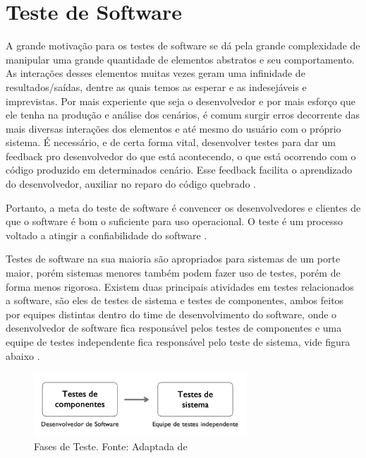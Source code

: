 \documentclass[pnumabnt,normaltoc,espacoumemeio,capchap]{abnt}
\begin{document}
\section{Teste de Software}
\par 

\par A grande motivação para os testes de software se dá pela grande complexidade de manipular uma grande quantidade de elementos abstratos e seu comportamento. As interações desses elementos muitas vezes geram uma infinidade de resultados/saídas, dentre as quais temos as esperar e as indesejáveis e imprevistas. Por mais experiente que seja o desenvolvedor e por mais esforço que ele tenha na produção e análise dos cenários, é comum surgir erros decorrente das mais diversas interações dos elementos e até mesmo do usuário com o próprio sistema. É necessário, e de certa forma vital, desenvolver testes para dar um feedback pro desenvolvedor do que está acontecendo, o que está ocorrendo com o código produzido em determinados cenário. Esse feedback facilita o aprendizado do desenvolvedor, auxiliar no reparo do código quebrado \cite{TL04}.
\par 
\begin{citacao} 
Portanto, a meta do teste de software é convencer os desenvolvedores e clientes de que o software é bom o suficiente para uso operacional. O teste é um processo voltado a atingir a confiabilidade do software \cite{SV07}.
\end{citacao}
\par Testes de software na sua maioria são apropriados para sistemas de um porte maior, porém sistemas menores também podem fazer uso de testes, porém de forma menos rigorosa. Existem duas principais atividades em testes relacionados a software, são eles de testes de sistema e testes de componentes, ambos feitos por equipes distintas dentro do time de desenvolvimento do software, onde o desenvolvedor de software fica responsável pelos testes de componentes e uma equipe de testes independente fica responsável pelo teste de sistema, vide figura abaixo \cite{SV07}.
\begin{figure}[htbp]
	\centering
	\caption{Fases de Teste\label{fig:f1}. Fonte: Adaptada de }
	\includegraphics[width=8cm,scale=1]{images/f1.png}
\end{figure}
\end{document}
